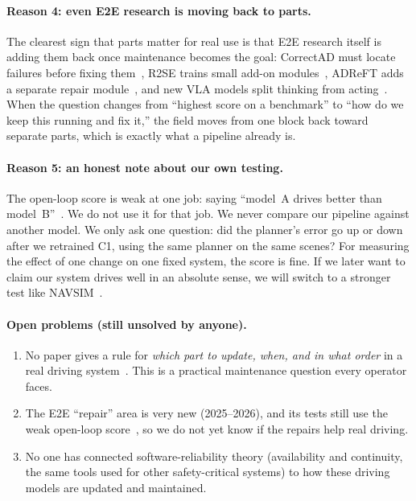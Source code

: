 \documentclass[11pt,a4paper]{article}
\begin{document}
\paragraph{Reason 4: even E2E research is moving back to parts.}
The clearest sign that parts matter for real use is that E2E research
itself is adding them back once maintenance becomes the goal: CorrectAD
must locate failures before fixing them~\cite{ma2025correctad}, R2SE
trains small add-on modules~\cite{liu2025r2se}, ADReFT adds a separate
repair module~\cite{cheng2025adreft}, and new VLA models split thinking
from acting~\cite{hu2025vla}. When the question changes from
``highest score on a benchmark'' to ``how do we keep this running and fix
it,'' the field moves from one block back toward separate parts, which is
exactly what a pipeline already is.

\paragraph{Reason 5: an honest note about our own testing.} The open-loop
score is weak at one job: saying ``model~A drives better than
model~B''~\cite{codevilla2018offline,zhai2023rethinking}. We do not use it
for that job. We never compare our pipeline against another model. We only
ask one question: did the planner's error go up or down after we retrained
C1, using the same planner on the same scenes? For measuring the effect of
one change on one fixed system, the score is fine. If we later want to
claim our system drives well in an absolute sense, we will switch to a
stronger test like NAVSIM~\cite{dauner2024navsim}.

\paragraph{Open problems (still unsolved by anyone).}
\begin{enumerate}[noitemsep]
    \item No paper gives a rule for \emph{which part to update, when, and
          in what order} in a real driving system~\cite{chen2024e2esurvey,hu2025vla}.
          This is a practical maintenance question every operator faces.
    \item The E2E ``repair'' area is very new (2025--2026), and its tests
          still use the weak open-loop score~\cite{ma2025correctad,liu2025r2se},
          so we do not yet know if the repairs help real driving.
    \item No one has connected software-reliability theory (availability
          and continuity, the same tools used for other safety-critical
          systems) to how these driving models are updated and maintained.
\end{enumerate}
\end{document}
